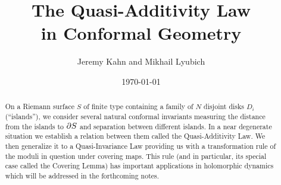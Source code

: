 
\baselineskip=24pt 
%

 







\bigskip\bigskip

\title[Quasi-Additivity Law]{The Quasi-Additivity Law \\ in Conformal Geometry }
\author {Jeremy Kahn and Mikhail Lyubich}
\address{Stony Brook University and University of Toronto} 
\date{\today}


\begin{abstract} 
On a Riemann surface $S$ of finite type containing a family of $N$ disjoint disks $D_i$ (``islands''),
we consider several natural conformal invariants measuring the distance from the islands to $\partial S$ 
and separation between different islands. In a near degenerate situation we
establish a relation between them called the Quasi-Additivity Law.
We then  generalize it to a  Quasi-Invariance Law 
providing us with a transformation rule of the moduli in question under
covering maps.    
This rule (and in particular, its special case  called the  Covering Lemma) 
has important applications in holomorphic dynamics which will be addressed in the forthcoming notes. 
\end{abstract}



\setcounter{tocdepth}{1}
 
\maketitle



%


%

%
%










